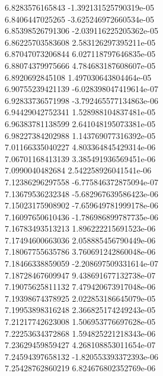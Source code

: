 {6.8283576165843 -1.392131525790319e-05
 \\
6.8406447025265 -3.625246972660534e-05
 \\
6.85398526791306 -2.039116225205362e-05
 \\
6.86225703583608 2.583126297395211e-05
 \\
6.87047073206844 6.027118797646835e-05
 \\
6.88074379975666 4.784683187608607e-05
 \\
6.8920692845108 1.497030643804464e-05
 \\
6.90755239421139 -6.028398047419614e-07
 \\
6.92833736571998 -3.792465577134863e-06
 \\
6.94429042752341 1.528988104837481e-05
 \\
6.96383781138599 2.641048195073381e-05
 \\
6.98227384202988 1.143769077316392e-05
 \\
7.01166335040227 4.803364845429314e-06
 \\
7.06701168413139 3.385491936569451e-06
 \\
7.0990040482684 2.542258926041541e-06
 \\
7.12386296297558 -6.775846372875094e-07
 \\
7.13679536232348 -5.682967639586423e-06
 \\
7.15023175908902 -7.659649781999178e-06
 \\
7.16097650610436 -1.786986899787735e-06
 \\
7.16783493513213 1.896222215691523e-06
 \\
7.17494600663036 2.058885456790449e-06
 \\
7.18067755635786 3.760691242860048e-06
 \\
7.18466338859059 -2.208697509331614e-07
 \\
7.18728467609947 9.438691677132738e-07
 \\
7.19075625811132 7.479420673917048e-06
 \\
7.19398674378925 2.022853186645079e-05
 \\
7.19953898316248 2.366825174249243e-05
 \\
7.21217742623008 1.506953776697628e-05
 \\
7.22253634372868 1.594825221218343e-06
 \\
7.23629459859427 4.268108853011654e-07
 \\
7.24594397658132 -1.820553393372393e-06
 \\
7.25428762860219 6.824676802352769e-06
}
